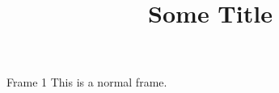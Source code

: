 \documentclass{beamer}
\title{Some Title}
\begin{document}
\begin{frame}
\titlepage
\end{frame}

\begin{frame}{Frame 1}
This is a normal frame.
\end{frame}
\end{document}
